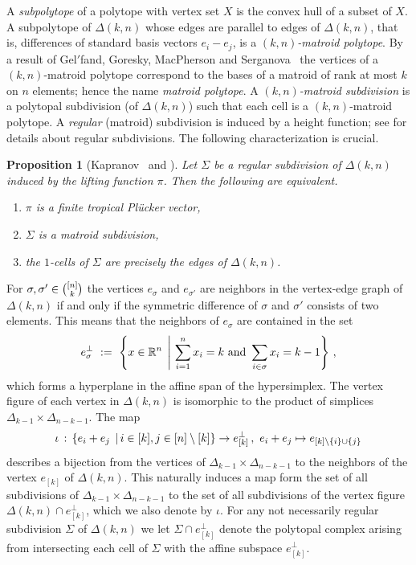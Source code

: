 \documentclass[11pt,a4paper]{amsart}
\newcommand{\RR}{{\mathbb{R}}}
\newcommand{\SetOf}[2]{\left\{#1\vphantom{#2}\,\right.\left|\,\vphantom{#1}#2\right\}}
\newcommand\cprime{$'$}
\newcommand{\Hypersimplex}[2]{{\Delta(#1,#2)}}
\theoremstyle{plain}
\newtheorem{proposition}[theorem]{Proposition}
\theoremstyle{definition}
\begin{document}
A \emph{subpolytope} of a polytope with vertex set $X$ is the convex hull of a subset of $X$. A
subpolytope of $\Delta(k,n)$ whose edges are parallel to edges of $\Delta(k,n)$, that is,
differences of standard basis vectors $e_i-e_j$, is a \emph{$(k,n)$-matroid polytope}.  By a result
of Gel{\cprime}fand, Goresky, MacPherson and Serganova~\cite[Thm.~4.1]{GelfandEtAl87} the 
vertices of a $(k,n)$-matroid
polytope correspond to the bases of a matroid of rank at most $k$ on $n$ elements; hence the name
\emph{matroid polytope}.  A \emph{$(k,n)$-matroid subdivision} is a polytopal subdivision (of
$\Delta(k,n)$) such that each cell is a $(k,n)$-matroid polytope.  A \emph{regular} (matroid)
subdivision is induced by a height function; see \cite[Sec.~2.2.3]{Triangulations} for details about
regular subdivisions.  The following characterization is crucial.

\begin{proposition}[{Kapranov~\cite{MR1237834} and \cite[Prop.~2.2]{TLS}}]
  \label{prop:matroid_decomposition}
  Let $\Sigma$ be a regular subdivision of $\Delta(k,n)$ induced by the lifting function $\pi$.  Then
  the following are equivalent.
  \begin{enumerate}
  \item $\pi$ is a finite tropical Pl\"ucker vector,
  \item $\Sigma$ is a matroid subdivision,
  \item \label{it:matroid_decomposition:edges} the $1$-cells of $\Sigma$ are precisely the edges of
    $\Delta(k,n)$.
  \end{enumerate}
\end{proposition}

For $\sigma,\sigma'\in\tbinom{[n]}{k}$ the vertices $e_\sigma$ and $e_{\sigma'}$ are neighbors in
the vertex-edge graph of $\Delta(k,n)$ if and only if the symmetric difference of $\sigma$ and
$\sigma'$ consists of two elements.  This means that the neighbors of $e_\sigma$ are contained in
the set
\[
e_\sigma^\perp \ := \ \SetOf{x \in \RR^n}{\sum_{i=1}^n x_i=k \text{ and } \sum_{i\in\sigma} x_i=k-1}\,,
\]
which forms a hyperplane in the affine span of the hypersimplex.  The vertex figure of each vertex
in $\Delta(k,n)$ is isomorphic to the product of simplices $\Delta_{k-1}\times\Delta_{n-k-1}$.  The map
\[
\iota \,:\, \SetOf{e_i+e_j}{i\in[k],j\in[n]\setminus [k]} \to e_{[k]}^\perp \,, \ e_i+e_j\mapsto e_{[k]\setminus\{i\}\cup\{j\}}
\]
describes a bijection from the vertices of $\Delta_{k-1}\times\Delta_{n-k-1}$ to the neighbors of
the vertex $e_{[k]}$ of $\Delta(k,n)$. This naturally induces a map form the set of all subdivisions of
$\Delta_{k-1}\times\Delta_{n-k-1}$ to the set of all subdivisions of the vertex figure $\Hypersimplex kn \cap
e_{[k]}^\perp$, which we also denote by $\iota$. For any not necessarily regular subdivision $\Sigma$ of
$\Delta(k,n)$ we let $\Sigma\cap e_{[k]}^\perp$ denote the polytopal complex arising from intersecting
each cell of $\Sigma$ with the affine subspace $e_{[k]}^\perp$.
\end{document}
